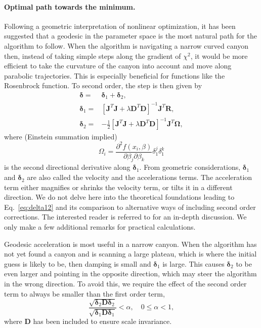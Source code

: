 \documentclass{article}
\begin{document}
\paragraph{Optimal path towards the minimum.} Following a geometric interpretation of nonlinear optimization, it has been suggested that a geodesic in the parameter space is the most natural path for the algorithm to follow. When the algorithm is navigating a narrow curved canyon then, instead of taking simple steps along the gradient of $\chi^2$, it would be more efficient to take the curvature of the canyon into account and move along parabolic trajectories. This is especially beneficial for functions like the Rosenbrock function. To second order, the step is then given by
\begin{equation}
  \label{eq:delta12}
  \begin{split}
    \bm\delta =& \bm\delta_1 + \bm\delta_2, \\
    \bm\delta_1 =& \left[ \bm J^T \bm J + \lambda\bm D^T\bm D
    \right]^{-1} \bm J^T \bm R, \\
    \bm\delta_2 =& -\frac{1}{2} \left[ \bm J^T \bm J + \lambda\bm
      D^T\bm D\right]^{-1} \bm J^T \bm\Omega,
  \end{split}
\end{equation}
where (Einstein summation implied)
\begin{equation}
  \label{eq:omega}
  \Omega_i = \frac{\partial^2
    f(x_i,\beta)}{\partial\beta_j \partial\beta_k} \delta_1^j
  \delta_1^k
\end{equation}
is the second directional derivative along $\bm\delta_1$. From geometric considerations, $\bm\delta_1$ and $\bm\delta_2$ are also called the velocity and the accelerations terms. The acceleration term either magnifies or shrinks the velocity term, or tilts it in a different direction. We do not delve here into the theoretical foundations leading to Eq.~\eqref{eq:delta12} and its comparison to alternative ways of including second order corrections. The interested reader is referred to \cite{transtrum10, transtrum11, transtrum12} for an in-depth discussion. We only make a few additional remarks for practical calculations.

Geodesic acceleration is most useful in a narrow canyon. When the algorithm has not yet found a canyon and is scanning a large plateau, which is where the initial guess is likely to be, then damping is small and $\bm\delta_1$ is large. This causes $\bm\delta_2$ to be even larger and pointing in the opposite direction, which may steer the algorithm in the wrong direction. To avoid this, we require the effect of the second order term to always be smaller than the first order term,
\begin{equation}
  \label{eq:acc_alpha}
  \frac{\sqrt{\bm\delta_2\bm D\bm\delta_2}}{\sqrt{\bm\delta_1\bm
      D\bm\delta_1}} < \alpha, \quad 0 \le \alpha < 1,
\end{equation}
where $\bm D$ has been included to ensure scale invariance.
\end{document}
